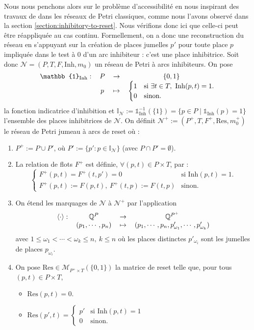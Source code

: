 \documentclass{article}
\theoremstyle{remark}
\theoremstyle{remark}
\newcommand{\extend}[1][\cdot]{\langle #1 \rangle}
\newcommand{\function}[5]{
    \begin{tabular}{r c c c}
         $#1 :$ & $#2$ & $\rightarrow$ & $#3$ \\
                & $#4$ &   $\mapsto$   & $#5$
    \end{tabular}
}
\newcommand{\indicator}{\mathbb{1}}
\newcommand{\inhibitor}{\mathrm{Inh}}
\newcommand{\reset}{\mathrm{Res}}
\begin{document}
Nous nous penchons alors sur le problème d'accessibilité en nous inspirant des travaux de \cite{dufourd} dans les réseaux de Petri classiques, comme nous l'avons observé dans la section \ref{section:inhibitory-to-reset}. Nous vérifions donc ici que celle-ci peut être réappliquée au cas continu. Formellement, on a donc une reconstruction du réseau en s'appuyant sur la création de places jumelles $p'$ pour toute place $p$ impliquée dans le test à 0 d'un arc inhibiteur : c'est une place inhibitrice. Soit donc $\mathcal{N} = (P, T, F, \inhibitor, m_0)$ un réseau de Petri à arcs inhibiteurs. On pose
\begin{equation*}
    \function{\indicator_{\inhibitor}}{P}{\{0, 1\}}{p}{\begin{cases}
        1 & \text{si } \exists t \in T,\ \inhibitor(p, t) = 1. \\
        0 & \text{sinon.}
    \end{cases}}
\end{equation*}
la fonction indicatrice d'inhibition et $\mathbb{I}_{\mathcal{N}} := \indicator_{\inhibitor}^{-1}(\{1\}) = \{p \in P \mid \indicator_{\inhibitor}(p) = 1\}$ l'ensemble des places inhibitrices de $\mathcal{N}$. On définit $\mathcal{N}^+ := (P^+, T, F^+, \reset, m_0^+)$ le réseau de Petri jumeau à arcs de reset où : \begin{enumerate}
    \item $P^+ := P \cup P'$, où $P' := \{p' : p \in \mathbb{I}_{\mathcal{N}}\}$ (avec $P \cap P' = \emptyset$).
    \item La relation de flots $F^+$ est définie, $\forall (p, t) \in P \times T$, par : \[\begin{cases}
        F^+(p, t) = F^+(t, p') = 0 & \text{si } \inhibitor(p, t) = 1.\\
        F^+(p, t) := F(p, t),\ F^+(t, p) := F(t, p) & \text{sinon.}
    \end{cases}\]
    \item On étend les marquages de $\mathcal{N}$ à $\mathcal{N^+}$ par l'application \begin{equation*}
        \function{\extend}{\mathbb{Q}^P}{\mathbb{Q}^{P^+}}{(p_1, \cdots, p_n)}{(p_1, \cdots, p_n, p'_{\omega_1}, \cdots, p'_{\omega_k})}
    \end{equation*}
    avec $1 \leq \omega_1 < \cdots < \omega_k \leq n,\ k \leq n$ où les places distinctes $p'_{\omega_i}$ sont les jumelles de places $p_{\omega_i}$.
    \item On pose $\reset \in \mathcal{M}_{P^+ \times T}(\{0, 1\})$ la matrice de reset telle que, pour tous $(p, t) \in P \times T$, \begin{itemize}
        \item $\reset(p, t) = 0$.
        \item $\reset(p', t) = \begin{cases}
            p' & \text{si } \inhibitor(p, t) = 1 \\
            0  & \text{sinon.}
        \end{cases}$
    \end{itemize}
\end{enumerate}
\end{document}
